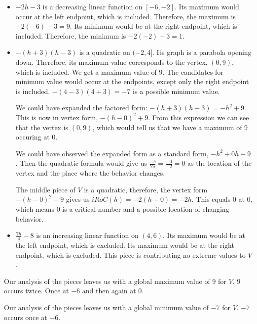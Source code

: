 \documentclass{ximera}
\begin{document}
\begin{itemize}
  \item \textbf{$-2h-3$} is a decreasing linear function on $[-6, -2]$.  Its maximum would occur at the left endpoint, which is included. Therefore, the maximum is $-2(-6)-3 = 9$. Its minimum would be at the right endpoint, which is included. Therefore, the minimum is $-2(-2)-3 = 1$.

  \item \textbf{$-(h+3)(h-3)$} is a quadratic on $(-2, 4]$.  Its graph is a parabola opening down.  Therefore, its maximum value corresponds to the vertex, $(0, 9)$, which is included.  We get a maximum value of $9$.  The candidates for minimum value would occur at the endpoints, except only the right endpoint is included.  $-(4-3)(4+3) = -7$ is a possible minimum value.


\begin{observation}


We could have expanded the factored form: $-(h+3)(h-3) = -h^2 + 9$.  This is now in vertex form, $-(h-0)^2 + 9$. From this expression we can see that the vertex is $(0, 9)$, which would tell us that we have a maximum of $9$ occuring at $0$.


We could have observed the expanded form as a standard form, $-h^2 + 0 h + 9$.  Then the quadratic formula would give us $\frac{-b}{2a} = \frac{-0}{-2} = 0$ as the location of the vertex and the place where the behavior changes.


The middle piece of $V$ is a quadratic, therefore, the vertex form $-(h-0)^2 + 9$ gives us $iRoC(h) = -2(h-0) = -2h$.  This equals $0$ at $0$, which means $0$ is a critical number and a possible location of changing behavior.

\end{observation}



  \item \textbf{$\frac{7h}{4} - 8$} is an increasing linear function on $(4, 6)$.  Its maximum would be at the left endpoint, which is excluded. Its maximum would be at the right endpoint, which is excluded. This piece is contributing no extreme values to $V$.
\end{itemize}


Our analysis of the pieces leaves us with a global maximum value of $9$ for $V$.  $9$ occurs twice.  Once at $-6$ and then again at $0$.

Our analysis of the pieces leaves us with a global minimum value of $-7$ for $V$. $-7$ occurs once at $-6$.
\end{document}
